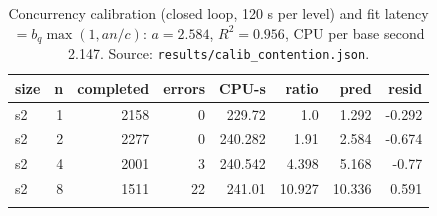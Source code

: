 \begin{table}[htbp]
\centering
\footnotesize
\caption{Concurrency calibration (closed loop, 120 s per level) and fit latency $= b_q \max(1, a n / c)$: $a=2.584$, $R^2=0.956$, CPU per base second 2.147. Source: \texttt{results/calib\_contention.json}.}
\label{tab:contention}
\setlength{\tabcolsep}{3pt}
\begin{tabular}{lrrrrrrr}
\toprule
\textbf{size} & \textbf{n} & \textbf{completed} & \textbf{errors} & \textbf{CPU-s} & \textbf{ratio} & \textbf{pred} & \textbf{resid} \\
\midrule
s2 & 1 & 2158 & 0 & 229.72 & 1.0 & 1.292 & -0.292 \\
s2 & 2 & 2277 & 0 & 240.282 & 1.91 & 2.584 & -0.674 \\
s2 & 4 & 2001 & 3 & 240.542 & 4.398 & 5.168 & -0.77 \\
s2 & 8 & 1511 & 22 & 241.01 & 10.927 & 10.336 & 0.591 \\
\botrule
\end{tabular}
\end{table}

